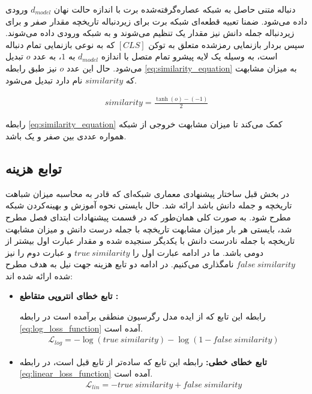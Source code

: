 دنباله متنی حاصل به شبکه عصاره‌گرفته‌شده برت 
با اندازه حالت نهان 
$d_{model}$
ورودی داده می‌شود.
ضمنا تعبیه قطعه‌ای شبکه برت برای زیردنباله تاریخچه مقدار صفر و برای زیردنباله جمله دانش نیز مقدار یک تنظیم می‌شوند و به شبکه ورودی داده می‌شوند. 
 سپس بردار بازنمایی رمزشده متعلق به توکن
$[CLS] $
که به نوعی بازنمایی تمام دنباله است،‌ به وسیله 
یک لایه پیشرو تمام متصل با اندازه
$d_{model}$
به 
$1$،
 به عدد 
 $o$
  تبدیل می‌شود. حال این عدد $o$ نیز طبق رابطه 
  \ref{eq:similarity_equation}
   به میزان مشابهت که $similarity$ نام دارد تبدیل می‌شود. 
  
  \begin{gather}\label{eq:similarity_equation}
  similarity = \frac{\tanh{(o)}-(-1)}{2}
  \end{gather}

رابطه 
\ref{eq:similarity_equation}
کمک می‌کند تا میزان مشابهت خروجی از شبکه همواره عددی بین صفر و یک باشد. 

\subsection{توابع هزینه}
در بخش قبل ساختار پیشنهادی معماری شبکه‌ای که قادر به محاسبه میزان شباهت تاریخچه و جمله دانش باشد ارائه شد. حال بایستی نحوه آموزش و بهینه‌کردن شبکه مطرح شود. به صورت کلی همان‌طور که در قسمت پیشنهادات ابتدای فصل مطرح شد، بایستی هر بار میزان مشابهت تاریخچه با جمله درست دانش و میزان مشابهت تاریخچه با جمله نادرست دانش با یکدیگر سنجیده شده و مقدار عبارت اول بیشتر از دومی باشد. ما در ادامه عبارت اول را 
$true\:similarity$
و عبارت دوم را نیز
$false\:similarity$
نامگذاری می‌کنیم. در ادامه دو تابع هزینه جهت نیل به هدف مطرح شده ارائه شده اند:

\begin{itemize}
	\item 
	\textbf{
	تابع خطای انتروپی متقاطع 
	:
	}

	رابطه این تابع که از ایده مدل رگرسیون منطقی برآمده است در رابطه
	\ref{eq:log_loss_function}
	آمده است. 
\begin{gather}\label{eq:log_loss_function}
\mathcal{L}_{log} = -\log{(true\:similarity)} -  \log{(1-false\:similarity)} 
\end{gather}


	\item
	\textbf{
	تابع خطای خطی:
	}
رابطه این تابع که ساده‌تر از تابع قبل است، در رابطه 
\ref{eq:linear_loss_function}
آمده است.
\begin{gather}\label{eq:linear_loss_function}
\mathcal{L}_{lin} = -true\:similarity + false\:similarity 
\end{gather}


\end{itemize}

